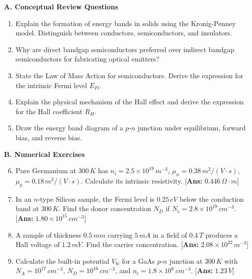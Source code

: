 \begin{practiceset}
\textbf{A. Conceptual Review Questions}
\begin{enumerate}
    \item Explain the formation of energy bands in solids using the Kronig-Penney model. Distinguish between conductors, semiconductors, and insulators.
    \item Why are direct bandgap semiconductors preferred over indirect bandgap semiconductors for fabricating optical emitters?
    \item State the Law of Mass Action for semiconductors. Derive the expression for the intrinsic Fermi level $E_{Fi}$.
    \item Explain the physical mechanism of the Hall effect and derive the expression for the Hall coefficient $R_H$.
    \item Draw the energy band diagram of a $p$-$n$ junction under equilibrium, forward bias, and reverse bias.
\end{enumerate}

\textbf{B. Numerical Exercises}
\begin{enumerate}
    \setcounter{enumi}{5}
    \item Pure Germanium at $300\,\si{K}$ has $n_i = 2.5 \times 10^{19}\,\si{m^{-3}}$, $\mu_n = 0.38\,\si{m^2/(V\cdot s)}$, $\mu_p = 0.18\,\si{m^2/(V\cdot s)}$. Calculate its intrinsic resistivity. \hfill [\textbf{Ans:} $0.446\,\si{\Omega\cdot m}$]
    \item In an $n$-type Silicon sample, the Fermi level is $0.25\,\si{eV}$ below the conduction band at $300\,\si{K}$. Find the donor concentration $N_D$ if $N_c = 2.8 \times 10^{19}\,\si{cm^{-3}}$. \hfill [\textbf{Ans:} $1.80 \times 10^{15}\,\si{cm^{-3}}$]
    \item A sample of thickness $0.5\,\si{mm}$ carrying $5\,\si{mA}$ in a field of $0.4\,\si{T}$ produces a Hall voltage of $1.2\,\si{mV}$. Find the carrier concentration. \hfill [\textbf{Ans:} $2.08 \times 10^{22}\,\si{m^{-3}}$]
    \item Calculate the built-in potential $V_{bi}$ for a GaAs $p$-$n$ junction at $300\,\si{K}$ with $N_A = 10^{17}\,\si{cm^{-3}}$, $N_D = 10^{16}\,\si{cm^{-3}}$, and $n_i = 1.8 \times 10^6\,\si{cm^{-3}}$. \hfill [\textbf{Ans:} $1.23\,\si{V}$]
\end{enumerate}
\end{practiceset}

